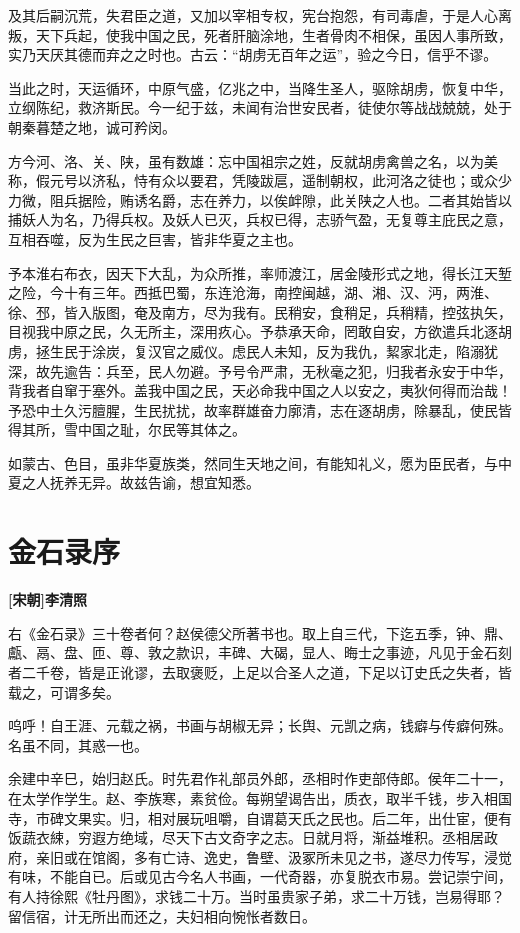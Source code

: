 \documentclass[UTF8,titlepage,oneside]{ctexbook}
\begin{document}
及其后嗣沉荒，失君臣之道，又加以宰相专权，宪台抱怨，有司毒虐，于是人心离叛，天下兵起，使我中国之民，死者肝脑涂地，生者骨肉不相保，虽因人事所致，实乃天厌其德而弃之之时也。古云：“胡虏无百年之运”，验之今日，信乎不谬。


当此之时，天运循环，中原气盛，亿兆之中，当降生圣人，驱除胡虏，恢复中华，立纲陈纪，救济斯民。今一纪于兹，未闻有治世安民者，徒使尔等战战兢兢，处于朝秦暮楚之地，诚可矜闵。


方今河、洛、关、陕，虽有数雄：忘中国祖宗之姓，反就胡虏禽兽之名，以为美称，假元号以济私，恃有众以要君，凭陵跋扈，遥制朝权，此河洛之徒也；或众少力微，阻兵据险，贿诱名爵，志在养力，以俟衅隙，此关陕之人也。二者其始皆以捕妖人为名，乃得兵权。及妖人已灭，兵权已得，志骄气盈，无复尊主庇民之意，互相吞噬，反为生民之巨害，皆非华夏之主也。


予本淮右布衣，因天下大乱，为众所推，率师渡江，居金陵形式之地，得长江天堑之险，今十有三年。西抵巴蜀，东连沧海，南控闽越，湖、湘、汉、沔，两淮、徐、邳，皆入版图，奄及南方，尽为我有。民稍安，食稍足，兵稍精，控弦执矢，目视我中原之民，久无所主，深用疚心。予恭承天命，罔敢自安，方欲遣兵北逐胡虏，拯生民于涂炭，复汉官之威仪。虑民人未知，反为我仇，絜家北走，陷溺犹深，故先逾告：兵至，民人勿避。予号令严肃，无秋毫之犯，归我者永安于中华，背我者自窜于塞外。盖我中国之民，天必命我中国之人以安之，夷狄何得而治哉！予恐中土久污膻腥，生民扰扰，故率群雄奋力廓清，志在逐胡虏，除暴乱，使民皆得其所，雪中国之耻，尔民等其体之。


如蒙古、色目，虽非华夏族类，然同生天地之间，有能知礼义，愿为臣民者，与中夏之人抚养无异。故兹告谕，想宜知悉。



\chapter*{金石录序}
\begin{center}
	\textbf{[宋朝]李清照}
\end{center}

右《金石录》三十卷者何？赵侯德父所著书也。取上自三代，下迄五季，钟、鼎、甗、鬲、盘、匝、尊、敦之款识，丰碑、大碣，显人、晦士之事迹，凡见于金石刻者二千卷，皆是正讹谬，去取褒贬，上足以合圣人之道，下足以订史氏之失者，皆载之，可谓多矣。


呜呼！自王涯、元载之祸，书画与胡椒无异；长舆、元凯之病，钱癖与传癖何殊。名虽不同，其惑一也。


余建中辛巳，始归赵氏。时先君作礼部员外郎，丞相时作吏部侍郎。侯年二十一，在太学作学生。赵、李族寒，素贫俭。每朔望谒告出，质衣，取半千钱，步入相国寺，市碑文果实。归，相对展玩咀嚼，自谓葛天氏之民也。后二年，出仕宦，便有饭蔬衣綀，穷遐方绝域，尽天下古文奇字之志。日就月将，渐益堆积。丞相居政府，亲旧或在馆阁，多有亡诗、逸史，鲁壁、汲冢所未见之书，遂尽力传写，浸觉有味，不能自已。后或见古今名人书画，一代奇器，亦复脱衣市易。尝记崇宁间，有人持徐熙《牡丹图》，求钱二十万。当时虽贵家子弟，求二十万钱，岂易得耶？留信宿，计无所出而还之，夫妇相向惋怅者数日。
\end{document}
